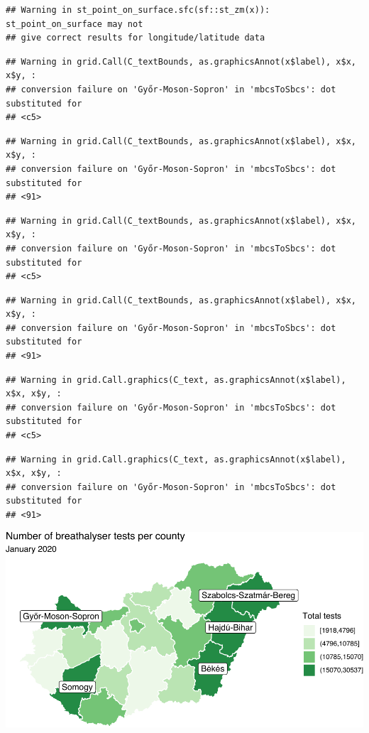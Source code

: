 \documentclass[
]{book}
\begin{document}
\begin{verbatim}
## Warning in st_point_on_surface.sfc(sf::st_zm(x)): st_point_on_surface may not
## give correct results for longitude/latitude data
\end{verbatim}

\begin{verbatim}
## Warning in grid.Call(C_textBounds, as.graphicsAnnot(x$label), x$x, x$y, :
## conversion failure on 'Győr-Moson-Sopron' in 'mbcsToSbcs': dot substituted for
## <c5>
\end{verbatim}

\begin{verbatim}
## Warning in grid.Call(C_textBounds, as.graphicsAnnot(x$label), x$x, x$y, :
## conversion failure on 'Győr-Moson-Sopron' in 'mbcsToSbcs': dot substituted for
## <91>
\end{verbatim}

\begin{verbatim}
## Warning in grid.Call(C_textBounds, as.graphicsAnnot(x$label), x$x, x$y, :
## conversion failure on 'Győr-Moson-Sopron' in 'mbcsToSbcs': dot substituted for
## <c5>
\end{verbatim}

\begin{verbatim}
## Warning in grid.Call(C_textBounds, as.graphicsAnnot(x$label), x$x, x$y, :
## conversion failure on 'Győr-Moson-Sopron' in 'mbcsToSbcs': dot substituted for
## <91>
\end{verbatim}

\begin{verbatim}
## Warning in grid.Call.graphics(C_text, as.graphicsAnnot(x$label), x$x, x$y, :
## conversion failure on 'Győr-Moson-Sopron' in 'mbcsToSbcs': dot substituted for
## <c5>
\end{verbatim}

\begin{verbatim}
## Warning in grid.Call.graphics(C_text, as.graphicsAnnot(x$label), x$x, x$y, :
## conversion failure on 'Győr-Moson-Sopron' in 'mbcsToSbcs': dot substituted for
## <91>
\end{verbatim}

\includegraphics{crime_mapping_files/figure-latex/addcountynamestoponly-1.pdf}
\end{document}
